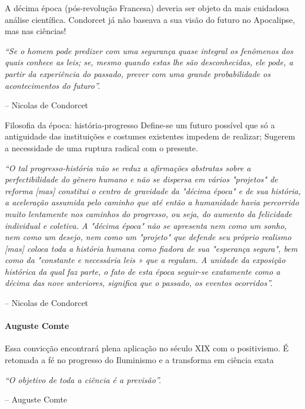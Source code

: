 A décima época (pós-revolução Francesa) deveria ser objeto da mais cuidadosa análise científica.
Condorcet já não baseava a sua visão do futuro no Apocalipse, mas nas ciências!

\begin{thinkerquote}
  \textit{“Se o homem pode predizer com uma segurança quase integral os fenômenos dos quais conhece as leis; se, mesmo quando estas lhe são desconhecidas, ele pode, a partir da experiência do passado, prever com uma grande probabilidade os acontecimentos do futuro”.}
  \begin{flushright}
    -- Nicolas de Condorcet
  \end{flushright}
\end{thinkerquote}

Filosofia da época: história-progresso
Define-se um futuro possível que só a antiguidade das instituições e costumes existentes impedem de realizar;
Sugerem a necessidade de uma ruptura radical com o presente.

\begin{thinkerquote}
  \textit{“O tal progresso-história não se reduz a afirmações abstratas sobre a perfectibilidade do gênero humano e não se dispersa em vários "projetos" de reforma [mas] constitui o centro de gravidade da "décima época" e de sua história, a aceleração assumida pelo caminho que até então a humanidade havia percorrido muito lentamente nos caminhos do progresso, ou seja, do aumento da felicidade individual e coletiva. A "décima época" não se apresenta nem como um sonho, nem como um desejo, nem como um "projeto" que defende seu próprio realismo [mas] coloca toda a história humana como fiadora de sua "esperança segura", bem como da "constante e necessária leis » que a regulam. A unidade da exposição histórica da qual faz parte, o fato de esta época seguir-se exatamente como a décima das nove anteriores, significa que o passado, os eventos ocorridos”.}
  \begin{flushright}
    -- Nicolas de Condorcet
  \end{flushright}
\end{thinkerquote}

\paragraph{Auguste Comte}
Essa convicção encontrará plena aplicação no século XIX com o positivismo.
É retomada a fé no progresso do Iluminismo e a transforma em ciência exata

\begin{thinkerquote}
  \textit{“O objetivo de toda a ciência é a previsão”.}
  \begin{flushright}
    -- Auguste Comte
  \end{flushright}
\end{thinkerquote}

